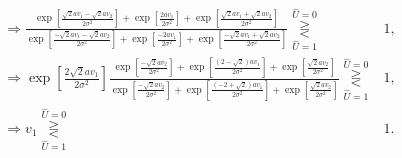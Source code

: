 \documentclass{assignment}
\begin{document}
\begin{sol}
\begin{align}
        \Longrightarrow\frac{\exp\left[\frac{\sqrt{2}av_1-\sqrt{2}av_2}{2\sigma^2}\right]+\exp\left[\frac{2av_1}{2\sigma^2}\right]+\exp\left[\frac{\sqrt{2}av_1+\sqrt{2}av_2}{2\sigma^2}\right]}{\exp\left[\frac{-\sqrt{2}av_1-\sqrt{2}av_2}{2\sigma^2}\right]+\exp\left[\frac{-2av_1}{2\sigma^2}\right]+\exp\left[\frac{-\sqrt{2}av_1+\sqrt{2}av_2}{2\sigma^2}\right]}\overset{\hat{U}=0}{\underset{\hat{U}=1}{\gtreqless}}&1,\\
        \Longrightarrow\exp\left[\frac{2\sqrt{2}av_1}{2\sigma^2}\right]\frac{\exp\left[\frac{-\sqrt{2}av_2}{2\sigma^2}\right]+\exp\left[\frac{(2-\sqrt{2})av_1}{2\sigma^2}\right]+\exp\left[\frac{\sqrt{2}av_2}{2\sigma^2}\right]}{\exp\left[\frac{-\sqrt{2}av_2}{2\sigma^2}\right]+\exp\left[\frac{(-2+\sqrt{2})av_1}{2\sigma^2}\right]+\exp\left[\frac{\sqrt{2}av_2}{2\sigma^2}\right]}\overset{\hat{U}=0}{\underset{\hat{U}=1}{\gtreqless}}&1,\\
        \Rightarrow v_1\overset{\hat{U}=0}{\underset{\hat{U}=1}{\gtreqless}}&1.
    \end{align}
\end{sol}
\end{document}
